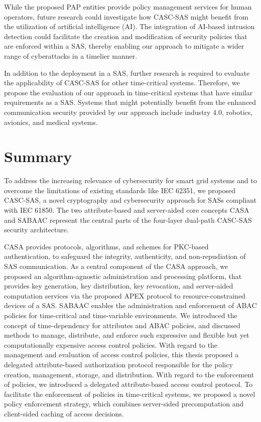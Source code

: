 While the proposed PAP entities provide policy management services for human operators, future research could investigate how CASC-SAS might benefit from the utilization of artificial intelligence (AI).
The integration of AI-based intrusion detection could facilitate the creation and modification of security policies that are enforced within a SAS, thereby enabling our approach to mitigate a wider range of cyberattacks in a timelier manner.

In addition to the deployment in a SAS, further research is required to evaluate the applicability of CASC-SAS for other time-critical systems.
Therefore, we propose the evaluation of our approach in time-critical systems that have similar requirements as a SAS.
Systems that might potentially benefit from the enhanced communication security provided by our approach include industry 4.0, robotics, avionics, and medical systems.

\section{Summary}
\label{sec:conclusion:summary}
To address the increasing relevance of cybersecurity for smart grid systems and to overcome the limitations of existing standards like IEC 62351, we proposed CASC-SAS, a novel cryptography and cybersecurity approach for SASs compliant with IEC 61850.
The two attribute-based and server-aided core concepts CASA and SABAAC represent the central parts of the four-layer dual-path CASC-SAS security architecture.

CASA provides protocols, algorithms, and schemes for PKC-based authentication, to safeguard the integrity, authenticity, and non-repudiation of SAS communication.
As a central component of the CASA approach, we proposed an algorithm-agnostic administration and processing platform, that provides key generation, key distribution, key revocation, and server-aided computation services via the proposed APEX protocol to resource-constrained devices of a SAS.
SABAAC enables the administration and enforcement of ABAC policies for time-critical and time-variable environments.
We introduced the concept of time-dependency for attributes and ABAC policies, and discussed methods to manage, distribute, and enforce such expressive and flexible but yet computationally expensive access control policies.
With regard to the management and evaluation of access control policies, this thesis proposed a delegated attribute-based authorization protocol responsible for the policy creation, management, storage, and distribution.
With regard to the enforcement of policies, we introduced a delegated attribute-based access control protocol.
To facilitate the enforcement of policies in time-critical systems, we proposed a novel policy enforcement strategy, which combines server-sided precomputation and client-sided caching of access decisions.

